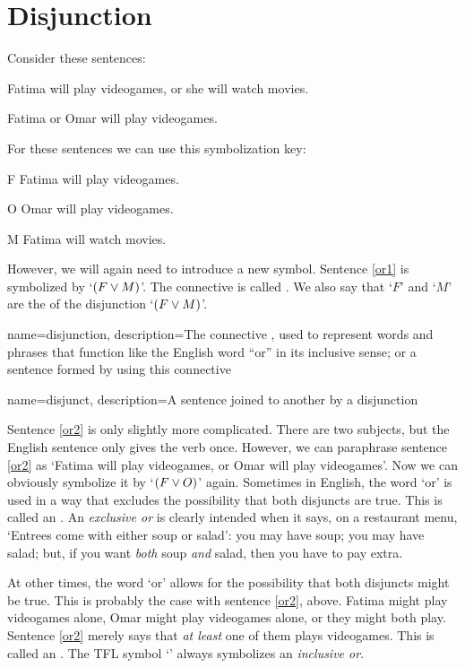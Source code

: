 \section{Disjunction}

Consider these sentences:
	\begin{earg}
		\item[\ex{or1}] Fatima will play videogames, or she will watch movies.
		\item[\ex{or2}] Fatima or Omar will play videogames. 
	\end{earg}
For these sentences we can use this symbolization key:
	\begin{ekey}
		\item[F] Fatima will play videogames.
		\item[O] Omar will play videogames.
		\item[M] Fatima will watch movies.
	\end{ekey}
However, we will again need to introduce a new symbol. Sentence \ref{or1} is symbolized by `$(F \vee M)$'. The connective is called . We also say that `$F$' and `$M$' are the  of the disjunction `$(F \vee M)$'.

{
name=disjunction,
description={The connective \eor, used to represent words and phrases that function like the English word ``or'' in its inclusive sense; or a sentence formed by using this connective}
}

{
name=disjunct,
description={A sentence joined to another by a \gls{disjunction}}
}

Sentence \ref{or2} is only slightly more complicated. There are two subjects, but the English sentence only gives the verb once. However, we can paraphrase sentence \ref{or2} as `Fatima will play videogames, or Omar will play videogames'. Now we can obviously symbolize it by `$(F \vee O)$' again.
Sometimes in English, the word `or' is used in a way that excludes the possibility that both disjuncts are true. This is called an .  An \emph{exclusive or} is clearly intended when it says, on a restaurant menu, `Entrees come with either soup or salad': you may have soup; you may have salad; but, if you want \emph{both} soup \emph{and} salad, then you have to pay extra.

At other times, the word `or' allows for the possibility that both disjuncts might be true. This is probably the case with sentence \ref{or2}, above. Fatima might play videogames alone, Omar might play videogames alone, or they might both play. Sentence \ref{or2} merely says that \emph{at least} one of them plays videogames. This is called an . The TFL symbol `\eor' always symbolizes an \emph{inclusive or}.

